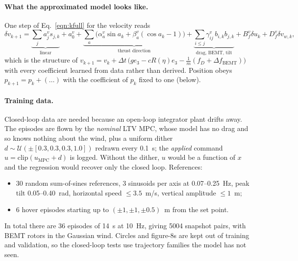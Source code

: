 \documentclass[11pt,a4paper]{article}
\begin{document}
	\paragraph{What the approximated model looks like.}
	One step of Eq.~\ref{eqn:kfull} for the velocity reads
	\begin{equation}
		\delta v_{k+1} = \underbrace{\textstyle\sum_j a^{v}_j s_{j,k}}_{\text{linear}}
		+ a^{v}_0
		+ \underbrace{\textstyle\sum_a \bigl(\alpha^{v}_a \sin a_k + \beta^{v}_a (\cos a_k - 1)\bigr)}_{\text{thrust direction}}
		+ \underbrace{\textstyle\sum_{i \le j} \gamma^{v}_{ij}\, b_{i,k} b_{j,k}}_{\text{drag, BEMT, tilt}}
		+ B^{v}_f \delta u_k + D^{v}_f \delta v_{w,k},
	\end{equation}
	which is the structure of
	$v_{k+1} = v_k + \Delta t\,\bigl(g e_3 - c R(\eta) e_3 - \tfrac{1}{m}(f_D + \Delta f_{\text{BEMT}})\bigr)$
	with every coefficient learned from data rather than derived. Position obeys
	$p_{k+1} = p_k + (\dots)$ with the coefficient of $p_k$ fixed to one (below).

	\paragraph{Training data.}
	Closed-loop data are needed because an open-loop integrator plant drifts away. The episodes
	are flown by the \emph{nominal} LTV MPC, whose model has no drag and so knows nothing about the
	wind, plus a uniform dither
	$d \sim \mathcal{U}(\pm[0.3, 0.3, 0.3, 1.0])$ redrawn every 0.1~s; the \emph{applied} command
	$u = \mathrm{clip}(u_{\text{MPC}} + d)$ is logged. Without the dither, $u$ would be a function of
	$x$ and the regression would recover only the closed loop. References:
	\begin{itemize}[leftmargin=*]
		\item 30 random sum-of-sines references, 3 sinusoids per axis at 0.07--0.25~Hz, peak tilt
		0.05--0.40~rad, horizontal speed $\le 3.5$~m/s, vertical amplitude $\le 1$~m;
		\item 6 hover episodes starting up to $(\pm1, \pm1, \pm0.5)$~m from the set point.
	\end{itemize}
	In total there are 36 episodes of 14~s at 10~Hz, giving 5004 snapshot pairs, with BEMT rotors in the
	Gaussian wind. Circles and figure-8s are kept out of training and validation, so the closed-loop
	tests use trajectory families the model has not seen.
\end{document}

